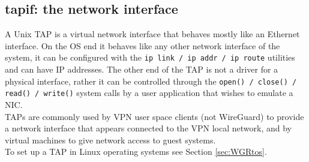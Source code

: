 \subsection{tapif: the network interface}\label{TapInfo}
A Unix TAP is a virtual network interface that behaves mostly like an Ethernet interface. On the OS end it behaves like any other network interface of the system, it can be configured with the \texttt{ip link / ip addr / ip route} utilities and can have IP addresses. The other end of the TAP is not a driver for a physical interface, rather it can be controlled through the \texttt{open() / close() / read() / write()} system calls by a user application that wishes to emulate a NIC.\\
TAPs are commonly used by VPN user space clients (not WireGuard) to provide a network interface that appears connected to the VPN local network, and by virtual machines to give network access to guest systems.
\\To set up a TAP in Linux operating systems see Section \ref{sec:WGRtos}.

